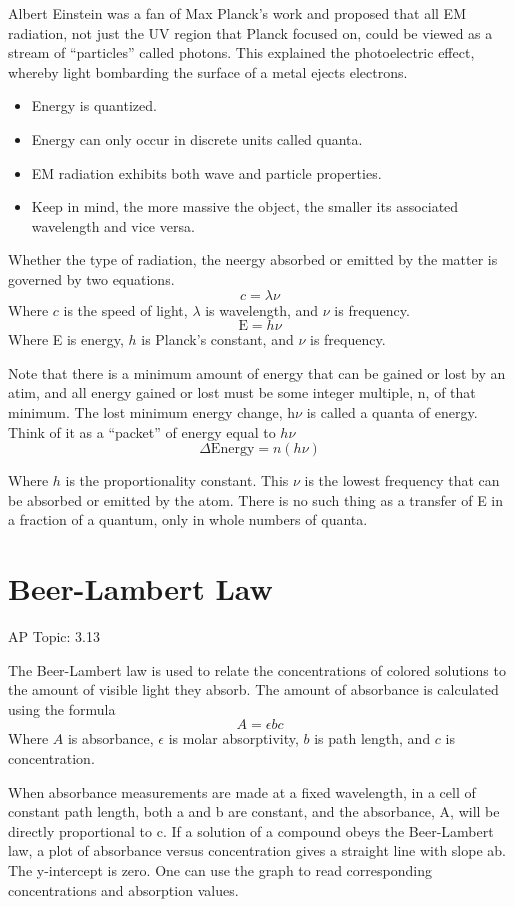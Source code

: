 \documentclass[../chem.tex]{subfiles}
\begin{document}
Albert Einstein was a fan of Max Planck's work and proposed that all EM radiation, not just the UV region that Planck focused on, could be 
viewed as a stream of ``particles'' called photons. This explained the photoelectric effect, whereby light bombarding the surface of a metal ejects electrons.
\begin{itemize}
    \item Energy is quantized.
    \item Energy can only occur in discrete units called quanta.
    \item EM radiation exhibits both wave and particle properties.
    \item Keep in mind, the more massive the object, the smaller its associated wavelength and vice versa.
\end{itemize}
Whether the type of radiation, the neergy absorbed or emitted by the matter is governed by two equations.
\[c=\lambda\nu\]
Where $c$ is the speed of light, $\lambda$ is wavelength, and $\nu$ is frequency.
\[\text{E}=h\nu\]
Where E is energy, $h$ is Planck's constant, and $\nu$ is frequency.

Note that there is a minimum amount of energy that can be gained or lost by an atim, and all energy gained or lost must be some integer multiple, n, of 
that minimum. The lost minimum energy change, h$\nu$ is called a quanta of energy. Think of it as a ``packet'' of energy equal to $h\nu$ 
\[\Delta{\text{Energy}}=n(h\nu)\]

Where $h$ is the proportionality constant. This $\nu$ is the lowest frequency that can be absorbed or emitted by the atom. There is no such thing as a 
transfer of E in a fraction of a quantum, only in whole numbers of quanta.

\section{Beer-Lambert Law}
AP Topic: 3.13

The Beer-Lambert law is used to relate the concentrations of colored solutions to the amount of visible light they absorb. The amount 
of absorbance is calculated using the formula
\[A=\epsilon b c\]
Where $A$ is absorbance, $\epsilon$ is molar absorptivity, $b$ is path length, and $c$ is concentration.

When absorbance measurements are made at a fixed wavelength, in a cell of constant path length, both a and b are constant, and the absorbance, A, will 
be directly proportional to c. If a solution of a compound obeys the Beer-Lambert law, a plot of absorbance versus concentration gives a 
straight line with slope ab. The y-intercept is zero. One can use the graph to read corresponding concentrations and absorption values.
\end{document}
